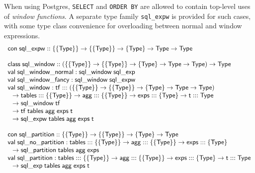 \documentclass{article}
\newcommand{\cd}[1]{\texttt{#1}}
\newcommand{\mt}[1]{\mathsf{#1}}
\begin{document}
When using Postgres, \cd{SELECT} and \cd{ORDER BY} are allowed to contain top-level uses of \emph{window functions}.  A separate type family \cd{sql\_expw} is provided for such cases, with some type class convenience for overloading between normal and window expressions.
$$\begin{array}{l}
  \mt{con} \; \mt{sql\_expw} :: \{\{\mt{Type}\}\} \to \{\{\mt{Type}\}\} \to \{\mt{Type}\} \to \mt{Type} \to \mt{Type} \\
  \\
  \mt{class} \; \mt{sql\_window} :: (\{\{\mt{Type}\}\} \to \{\{\mt{Type}\}\} \to \{\mt{Type}\} \to \mt{Type} \to \mt{Type}) \to \mt{Type} \\
  \mt{val} \; \mt{sql\_window\_normal} : \mt{sql\_window} \; \mt{sql\_exp} \\
  \mt{val} \; \mt{sql\_window\_fancy} : \mt{sql\_window} \; \mt{sql\_expw} \\
  \mt{val} \; \mt{sql\_window} : \mt{tf} ::: (\{\{\mt{Type}\}\} \to \{\{\mt{Type}\}\} \to \{\mt{Type}\} \to \mt{Type} \to \mt{Type}) \\
  \hspace{.1in} \to \mt{tables} ::: \{\{\mt{Type}\}\} \to \mt{agg} ::: \{\{\mt{Type}\}\} \to \mt{exps} ::: \{\mt{Type}\} \to \mt{t} ::: \mt{Type} \\
  \hspace{.1in} \to \mt{sql\_window} \; \mt{tf} \\
  \hspace{.1in} \to \mt{tf} \; \mt{tables} \; \mt{agg} \; \mt{exps} \; \mt{t} \\
  \hspace{.1in} \to \mt{sql\_expw} \; \mt{tables} \; \mt{agg} \; \mt{exps} \; \mt{t} \\
  \\
  \mt{con} \; \mt{sql\_partition} :: \{\{\mt{Type}\}\} \to \{\{\mt{Type}\}\} \to \{\mt{Type}\} \to \mt{Type} \\
  \mt{val} \; \mt{sql\_no\_partition} : \mt{tables} ::: \{\{\mt{Type}\}\} \to \mt{agg} ::: \{\{\mt{Type}\}\} \to \mt{exps} ::: \{\mt{Type}\} \\
  \hspace{.1in} \to \mt{sql\_partition} \; \mt{tables} \; \mt{agg} \; \mt{exps} \\
  \mt{val} \; \mt{sql\_partition} : \mt{tables} ::: \{\{\mt{Type}\}\} \to \mt{agg} ::: \{\{\mt{Type}\}\} \to \mt{exps} ::: \{\mt{Type}\} \to \mt{t} ::: \mt{Type} \\
  \hspace{.1in} \to \mt{sql\_exp} \; \mt{tables} \; \mt{agg} \; \mt{exps} \; \mt{t} \\

\end{array}$$
\end{document}
